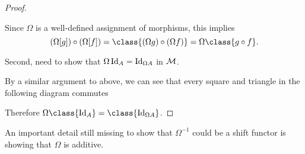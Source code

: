 \begin{proof}
\begin{center}
    \end{center}
    Since \( \Omega \) is a well-defined assignment of morphisms, this implies
    \[
        (\Omega [g]) \circ (\Omega [f]) = \class{(\Omega g) \circ (\Omega f)} = \Omega \class{g \circ f}.
    \]

    Second, need to show that \( \Omega \operatorname{Id}_A = \operatorname{Id}_{\Omega A} \) in \( {\mathcal{M}} \).

    By a similar argument to above, we can see that every square and triangle in the following diagram commutes
    \begin{center}
    \end{center}
    Therefore \( \Omega \class{\Id_A} = \class{\Id_{\Omega A}} \).
\end{proof}

An important detail still missing to show that \( \Omega^{-1} \) could be a shift functor is showing that \( \Omega \) is additive.

